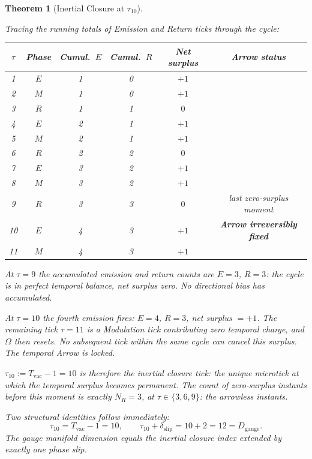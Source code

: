 \documentclass[11pt, letterpaper]{article}
\newcommand{\Dg}{D_{\mathrm{gauge}}}
\theoremstyle{definition}
\theoremstyle{plain}
\newtheorem{theorem}{Theorem}[section]
\begin{document}
\begin{theorem}[Inertial Closure at $\tau_{10}$]\label{thm:tau10}
\begin{rsbox}
Tracing the running totals of Emission and Return ticks through the cycle:

\medskip
\begin{center}
\small
\begin{tabular}{cccccc}
\toprule
$\tau$ & Phase & Cumul.\ $E$ & Cumul.\ $R$ & Net surplus & Arrow status \\
\midrule
1  & $E$ & 1 & 0 & $+1$ & \\
2  & $M$ & 1 & 0 & $+1$ & \\
3  & $R$ & 1 & 1 & $0$  & \\
4  & $E$ & 2 & 1 & $+1$ & \\
5  & $M$ & 2 & 1 & $+1$ & \\
6  & $R$ & 2 & 2 & $0$  & \\
7  & $E$ & 3 & 2 & $+1$ & \\
8  & $M$ & 3 & 2 & $+1$ & \\
9  & $R$ & 3 & 3 & $0$  & \textit{last zero-surplus moment} \\
10 & $E$ & 4 & 3 & $+1$ & \textbf{Arrow irreversibly fixed} \\
11 & $M$ & 4 & 3 & $+1$ & \\
\bottomrule
\end{tabular}
\end{center}
\medskip

At $\tau=9$ the accumulated emission and return counts are $E=3$, $R=3$: the
cycle is in perfect temporal balance, net surplus zero.  No directional bias
has accumulated.

At $\tau=10$ the fourth emission fires: $E=4$, $R=3$, net surplus $=+1$.
The remaining tick $\tau=11$ is a Modulation tick contributing zero temporal
charge, and $\Omega$ then resets.  No subsequent tick within the same cycle
can cancel this surplus.  The temporal Arrow is locked.

$\tau_{10}:=T_{\mathrm{vac}}-1=10$ is therefore the inertial closure
tick: the unique microtick at which the temporal surplus becomes permanent.
The count of zero-surplus instants before this moment is exactly $N_R=3$,
at $\tau\in\{3,6,9\}$: the arrowless instants.

Two structural identities follow immediately:
\[
\tau_{10} = T_{\mathrm{vac}}-1 = 10, \qquad
\tau_{10}+\delta_{\mathrm{slip}} = 10+2 = 12 = \Dg.
\]
The gauge manifold dimension equals the inertial closure index extended by
exactly one phase slip.
\end{rsbox}
\end{theorem}
\end{document}
